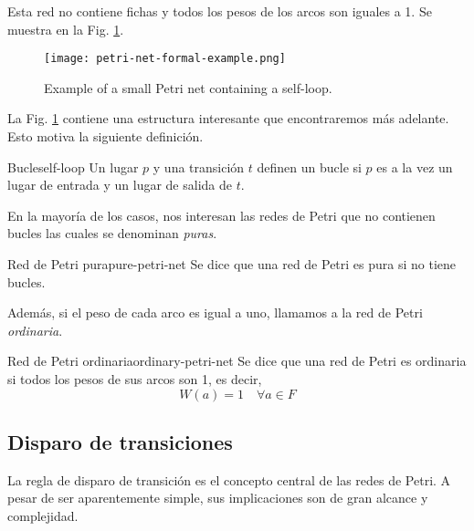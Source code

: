 Esta red no contiene fichas y todos los pesos de los arcos son iguales a 1.
Se muestra en la Fig. \ref{fig:petri-net-formal-example}.

\begin{figure}[!htb]
      \centering
      \texttt{[image: petri-net-formal-example.png]}
      \caption{Example of a small Petri net containing a self-loop.}
      \label{fig:petri-net-formal-example}
\end{figure}

La Fig. \ref{fig:petri-net-formal-example}
contiene una estructura interesante que encontraremos más adelante.
Esto motiva la siguiente definición.

\begin{definition}{Bucle}{self-loop}
      Un lugar $p$ y una transición $t$ definen un bucle si
      $p$ es a la vez un lugar de entrada y un lugar de salida de $t$.
\end{definition}

En la mayoría de los casos, nos interesan las redes de Petri que no contienen bucles
las cuales se denominan \emph{puras}.

\begin{definition}{Red de Petri pura}{pure-petri-net}
      Se dice que una red de Petri es pura si no tiene bucles.
\end{definition}

Además, si el peso de cada arco es igual a uno, llamamos a la red de Petri \emph{ordinaria}.

\begin{definition}{Red de Petri ordinaria}{ordinary-petri-net}
      Se dice que una red de Petri es ordinaria si todos los pesos de sus arcos son 1, es decir,
      \begin{equation*}
            W(a) = 1 \quad \forall a \in F
      \end{equation*}
\end{definition}

\subsection{Disparo de transiciones}
\label{sec:transition-firing}

La regla de disparo de transición es el concepto central de las redes de Petri. A pesar de ser
aparentemente simple, sus implicaciones son de gran alcance y complejidad.

